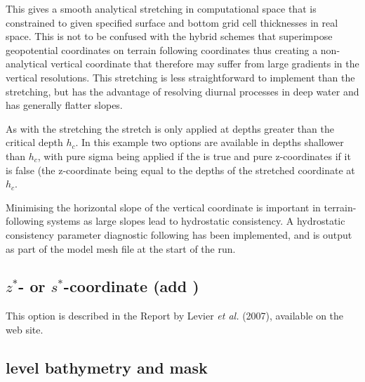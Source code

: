 {This gives a smooth analytical stretching in computational space that is constrained to given specified surface and bottom grid cell thicknesses in real space. This is not to be confused with the hybrid schemes that superimpose geopotential coordinates on terrain following coordinates thus creating a non-analytical vertical coordinate that therefore may suffer from large gradients in the vertical resolutions. This stretching is less straightforward to implement than the \citet{Song_Haidvogel_JCP94} stretching, but has the advantage of resolving diurnal processes in deep water and has generally flatter slopes.

As with the \citet{Song_Haidvogel_JCP94} stretching the stretch is only applied at depths greater than the critical depth $h_c$. In this example two options are available in depths shallower than $h_c$, with pure sigma being applied if the  is true and pure z-coordinates if it is false (the z-coordinate being equal to the depths of the stretched coordinate at $h_c$.

Minimising the horizontal slope of the vertical coordinate is important in terrain-following systems as large slopes lead to hydrostatic consistency. A hydrostatic consistency parameter diagnostic following \citet{Haney1991} has been implemented, and is output as part of the model mesh file at the start of the run.

\subsection{$z^*$- or $s^*$-coordinate (add ) }
\label{DOM_zgr_vvl}

This option is described in the Report by Levier \textit{et al.} (2007), available on 
the \NEMO web site. 


\subsection{level bathymetry and mask}
\label{DOM_msk}

}
